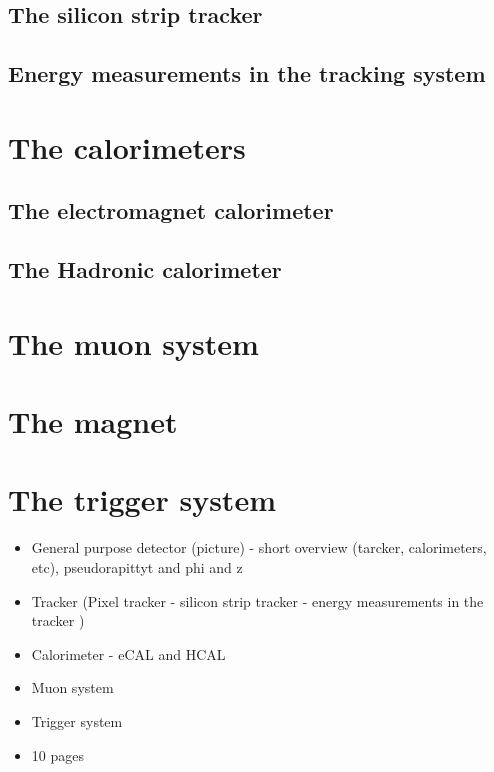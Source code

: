 \subsection*{The silicon strip tracker}

\subsection*{Energy measurements in the tracking system}

\section{The calorimeters}
\subsection*{The electromagnet calorimeter}
\subsection*{The Hadronic calorimeter}

\section{The muon system}

\section{The magnet}

\section{The trigger system}

\begin{itemize}
\item General purpose detector (picture) - short overview (tarcker, calorimeters, etc), pseudorapittyt and phi and z
\item Tracker (Pixel tracker - silicon strip tracker - energy measurements in the tracker )
\item Calorimeter - eCAL and HCAL
\item Muon system
\item Trigger system
\item 10 pages
\end{itemize}

\FloatBarrier
